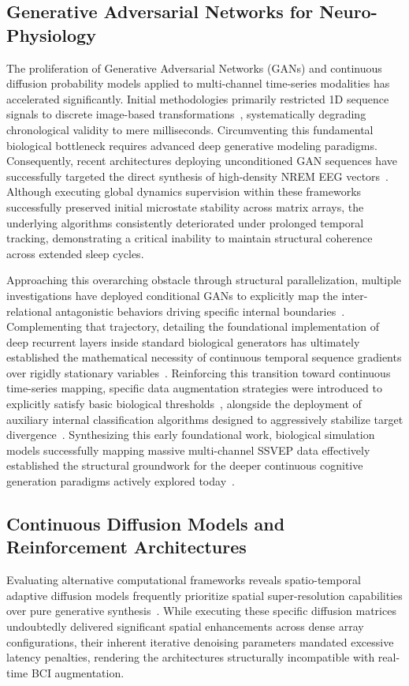 \documentclass[journal]{IEEEtran}
\begin{document}
\subsection{Generative Adversarial Networks for Neuro-Physiology}
The proliferation of Generative Adversarial Networks (GANs) and continuous diffusion probability models applied to multi-channel time-series modalities has accelerated significantly. Initial methodologies primarily restricted 1D sequence signals to discrete image-based transformations~\cite{hartmann2018eeggan}, systematically degrading chronological validity to mere milliseconds. Circumventing this fundamental biological bottleneck requires advanced deep generative modeling paradigms. Consequently, recent architectures deploying unconditioned GAN sequences have successfully targeted the direct synthesis of high-density NREM EEG vectors~\cite{zuo2025high}. Although executing global dynamics supervision within these frameworks successfully preserved initial microstate stability across matrix arrays, the underlying algorithms consistently deteriorated under prolonged temporal tracking, demonstrating a critical inability to maintain structural coherence across extended sleep cycles. 

Approaching this overarching obstacle through structural parallelization, multiple investigations have deployed conditional GANs to explicitly map the inter-relational antagonistic behaviors driving specific internal boundaries~\cite{vahid2022conditional}. Complementing that trajectory, detailing the foundational implementation of deep recurrent layers inside standard biological generators has ultimately established the mathematical necessity of continuous temporal sequence gradients over rigidly stationary variables~\cite{habashi2023generative}. Reinforcing this transition toward continuous time-series mapping, specific data augmentation strategies were introduced to explicitly satisfy basic biological thresholds~\cite{yoon2019time}, alongside the deployment of auxiliary internal classification algorithms designed to aggressively stabilize target divergence~\cite{odena2017conditional}. Synthesizing this early foundational work, biological simulation models successfully mapping massive multi-channel SSVEP data effectively established the structural groundwork for the deeper continuous cognitive generation paradigms actively explored today~\cite{8852227}.

\subsection{Continuous Diffusion Models and Reinforcement Architectures}
Evaluating alternative computational frameworks reveals spatio-temporal adaptive diffusion models frequently prioritize spatial super-resolution capabilities over pure generative synthesis~\cite{10839074}. While executing these specific diffusion matrices undoubtedly delivered significant spatial enhancements across dense array configurations, their inherent iterative denoising parameters mandated excessive latency penalties, rendering the architectures structurally incompatible with real-time BCI augmentation. 
\end{document}
